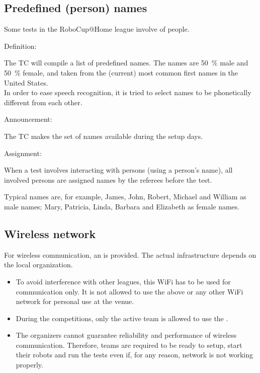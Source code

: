 \subsection{Predefined (person) names}\label{rule:scenario_names}

Some tests in the RoboCup@Home league involve  of people. 

\begin{enumerate}
	{\bf\item Definition:} The TC will compile a list of \NumNames predefined names. The names are \SI{50}{\percent} male and \SI{50}{\percent} female, and taken from the (current) most common first names in the United States.\\
	In order to ease speech recognition, it is tried to select names to be phonetically different from each other.

	{\bf\item Announcement:} The TC makes the set of names available during the setup days.
	{\bf\item Assignment:} When a test involves interacting with persons (using a person's name), all involved persons are assigned names by the referees before the test. 
\end{enumerate}

Typical names are, for example, James, John, Robert, Michael and William as male names; Mary, Patricia, Linda, Barbara and Elizabeth as female names.


\subsection{Wireless network}
\label{rule:scenario_wifi}

For wireless communication, an  is provided. The actual infrastructure depends on the local organization. 

\begin{itemize}
	\item To avoid interference with other leagues, this WiFi has to be used for communication only. It is not allowed to use the above or any other WiFi network for personal use at the venue.
	\item During the competitions, only the active team is allowed to use the . 
	\item The organizers cannot guarantee reliability and performance of wireless communication. Therefore, teams are required to be ready to setup, start their robots and run the tests even if, for any reason, network is not working properly.
\end{itemize}

